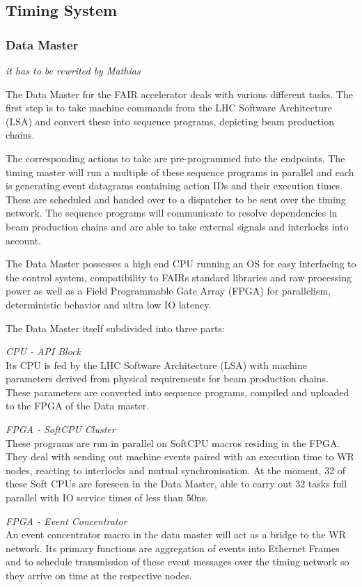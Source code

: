 \subsection{Timing System}

\subsubsection{Data Master}
\textit{ it has to be rewrited by Mathias}

The Data Master for the FAIR accelerator deals with various different tasks.
The first step is to take machine commands from the LHC Software
Architecture (LSA) and convert these into sequence programs,
depicting beam production chains.

The corresponding actions to take are pre-programmed into the endpoints.
The timing master will run a multiple of these sequence programs
in parallel and each is generating event datagrams containing action IDs
and their execution times. These are scheduled and handed over to a dispatcher
to be sent over the timing network. The sequence programs will communicate to
resolve dependencies in beam production chains and are able to take external
signals and interlocks into account.


The Data Master possesses a high end CPU running an
OS for easy interfacing to the control system, compatibility to 
FAIRs standard libraries and raw processing power as well as a 
Field Programmable Gate Array (FPGA) for parallelism, deterministic 
behavior and ultra low IO latency.

The Data Master itself subdivided into three parts:

\textit{CPU - API Block} \\
Its CPU is fed by the LHC Software
Architecture (LSA) with machine parameters derived from
physical requirements for beam production chains. These
parameters are converted into sequence programs,
compiled and uploaded to the FPGA of the Data master.

\textit{FPGA - SoftCPU Cluster} \\
These programs are run in
parallel on SoftCPU macros residing in the FPGA. They
deal with sending out machine events paired with an execution time to WR nodes, 
reacting to interlocks and mutual synchronisation. At the moment, 32 of these Soft CPUs are
foreseen in the Data Master, able to carry out 32 tasks full parallel with IO service times of less than 50ns.

\textit{FPGA - Event Concentrator} \\
An event concentrator macro in the data master will act as a bridge to the WR
network. Its primary functions are aggregation of events
into Ethernet Frames and to schedule transmission of these
event messages over the timing network so they arrive on
time at the respective nodes. 

